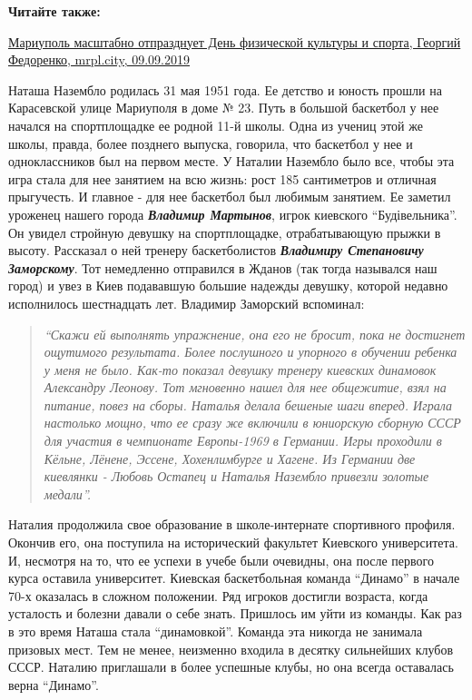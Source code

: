 \textbf{Читайте также:} 

\href{https://mrpl.city/blogs/view/mariupol-masshtabno-otprazdnuet-den-fizicheskoj-kultury-i-sporta}{%
Мариуполь масштабно отпразднует День физической культуры и спорта, Георгий Федоренко, mrpl.city, 09.09.2019}

Наташа Назембло родилась 31 мая 1951 года. Ее детство и юность прошли на
Карасевской улице Мариуполя в доме № 23. Путь в большой баскетбол у нее начался
на спортплощадке ее родной 11-й школы. Одна из учениц этой же школы, правда,
более позднего выпуска, говорила, что баскетбол у нее и одноклассников был на
первом месте. У Наталии Назембло было все, чтобы эта игра стала для нее
занятием на всю жизнь: рост 185 сантиметров и отличная прыгучесть. И главное -
для нее баскетбол был любимым занятием. Ее заметил уроженец нашего города
\textbf{\emph{Владимир Мартынов}}, игрок киевского \enquote{Будівельника}. Он увидел стройную девушку
на спортплощадке, отрабатывающую прыжки в высоту. Рассказал о ней тренеру
баскетболистов \emph{\textbf{Владимиру Степановичу Заморскому}}. Тот немедленно отправился в
Жданов (так тогда назывался наш город) и увез в Киев подававшую большие надежды
девушку, которой недавно исполнилось шестнадцать лет. Владимир Заморский
вспоминал: 

\begin{quote}
\em\enquote{Скажи ей выполнять упражнение, она его не бросит, пока не достигнет
ощутимого результата. Более послушного и упорного в обучении ребенка у меня не
было. Как-то показал девушку тренеру киевских динамовок Александру Леонову. Тот
мгновенно нашел для нее общежитие, взял на питание, повез на сборы. Наталья
делала бешеные шаги вперед. Играла настолько мощно, что ее сразу же включили в
юниорскую сборную СССР для участия в чемпионате Европы-1969 в Германии. Игры
проходили в Кёльне, Лёнене, Эссене, Хохенлимбурге и Хагене. Из Германии две
киевлянки - Любовь Остапец и Наталья Назембло привезли золотые медали}.
\end{quote}

Наталия продолжила свое образование в школе-интернате спортивного профиля.
Окончив его, она поступила на исторический факультет Киевского университета. И,
несмотря на то, что ее успехи в учебе были очевидны, она после первого курса
оставила университет. Киевская баскетбольная команда \enquote{Динамо} в начале 70-х
оказалась в сложном положении. Ряд игроков достигли возраста, когда усталость и
болезни давали о себе знать. Пришлось им уйти из команды. Как раз в это время
Наташа стала \enquote{динамовкой}. Команда эта никогда не занимала призовых мест. Тем
не менее, неизменно входила в десятку сильнейших клубов СССР. Наталию
приглашали в более успешные клубы, но она всегда оставалась верна \enquote{Динамо}.

